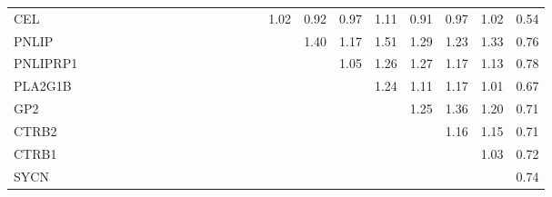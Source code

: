 \begin{longtable}{lrrrrrrrrrrrrrrrrrrrrrr}
CEL      &              &              &              &              &             &             &             &             &            &              &            &            &             &           &        1.02 &           0.92 &          0.97 &      1.11 &        0.91 &        0.97 &       1.02 &       0.54 \\
PNLIP    &              &              &              &              &             &             &             &             &            &              &            &            &             &           &             &           1.40 &          1.17 &      1.51 &        1.29 &        1.23 &       1.33 &       0.76 \\
PNLIPRP1 &              &              &              &              &             &             &             &             &            &              &            &            &             &           &             &                &          1.05 &      1.26 &        1.27 &        1.17 &       1.13 &       0.78 \\
PLA2G1B  &              &              &              &              &             &             &             &             &            &              &            &            &             &           &             &                &               &      1.24 &        1.11 &        1.17 &       1.01 &       0.67 \\
GP2      &              &              &              &              &             &             &             &             &            &              &            &            &             &           &             &                &               &           &        1.25 &        1.36 &       1.20 &       0.71 \\
CTRB2    &              &              &              &              &             &             &             &             &            &              &            &            &             &           &             &                &               &           &             &        1.16 &       1.15 &       0.71 \\
CTRB1    &              &              &              &              &             &             &             &             &            &              &            &            &             &           &             &                &               &           &             &             &       1.03 &       0.72 \\
SYCN     &              &              &              &              &             &             &             &             &            &              &            &            &             &           &             &                &               &           &             &             &            &       0.74 \\
\end{longtable}


